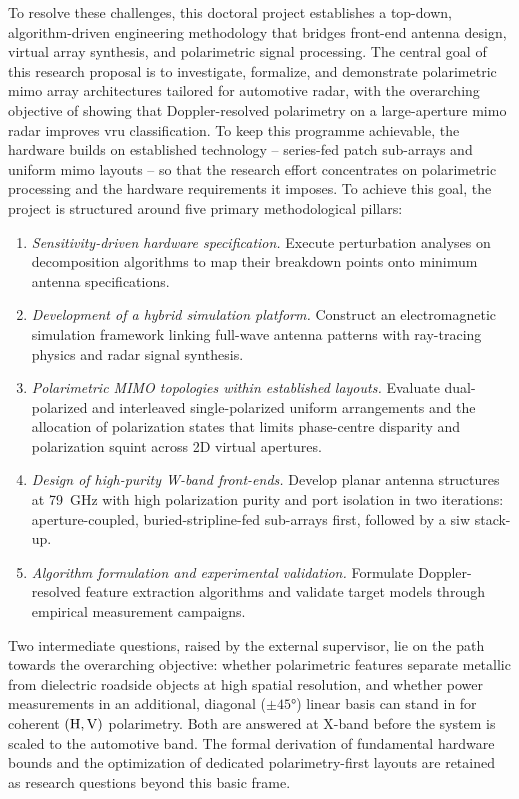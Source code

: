 To resolve these challenges, this doctoral project establishes a top-down, algorithm-driven engineering methodology that bridges front-end antenna design, virtual array synthesis, and polarimetric signal processing.
The central goal of this research proposal is to investigate, formalize, and demonstrate polarimetric \gls{mimo} array architectures tailored for automotive radar, with the overarching objective of showing that Doppler-resolved polarimetry on a large-aperture \gls{mimo} radar improves \gls{vru} classification.
To keep this programme achievable, the hardware builds on established technology -- series-fed patch sub-arrays and uniform \gls{mimo} layouts -- so that the research effort concentrates on polarimetric processing and the hardware requirements it imposes.
To achieve this goal, the project is structured around five primary methodological pillars:
\begin{enumerate}
    \item \textit{Sensitivity-driven hardware specification.} Execute perturbation analyses on decomposition algorithms to map their breakdown points onto minimum antenna specifications.
    \item \textit{Development of a hybrid simulation platform.} Construct an electromagnetic simulation framework linking full-wave antenna patterns with ray-tracing physics and radar signal synthesis.
    \item \textit{Polarimetric MIMO topologies within established layouts.} Evaluate dual-polarized and interleaved single-polarized uniform arrangements and the allocation of polarization states that limits phase-centre disparity and polarization squint across 2D virtual apertures.
    \item \textit{Design of high-purity W-band front-ends.} Develop planar antenna structures at \qty{79}{\giga\hertz} with high polarization purity and port isolation in two iterations: aperture-coupled, buried-stripline-fed sub-arrays first, followed by a \gls{siw} stack-up.
    \item \textit{Algorithm formulation and experimental validation.} Formulate Doppler-resolved feature extraction algorithms and validate target models through empirical measurement campaigns.
\end{enumerate}
Two intermediate questions, raised by the external supervisor, lie on the path towards the overarching objective: whether polarimetric features separate metallic from dielectric roadside objects at high spatial resolution, and whether power measurements in an additional, diagonal ($\pm\ang{45}$) linear basis can stand in for coherent $(\mathrm{H}, \mathrm{V})$ polarimetry.
Both are answered at X-band before the system is scaled to the automotive band.
The formal derivation of fundamental hardware bounds and the optimization of dedicated polarimetry-first layouts are retained as research questions beyond this basic frame.

